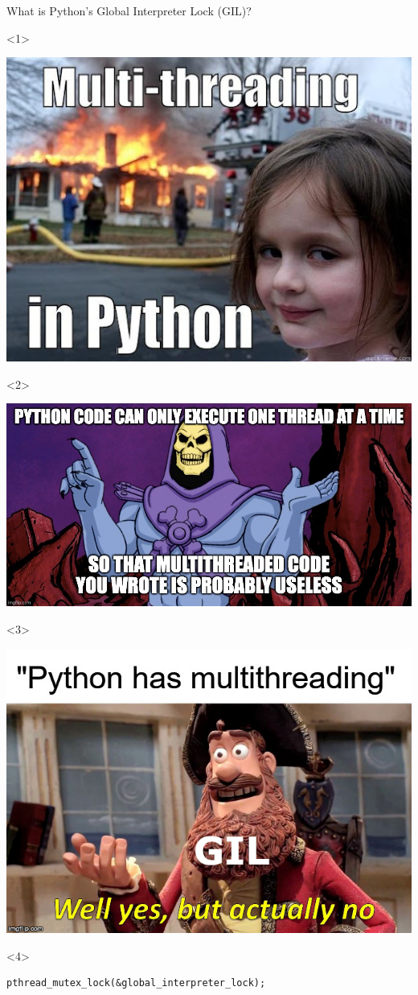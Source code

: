 \documentclass[aspectratio=169]{beamer}
\begin{document}
\begin{frame}[fragile]{What is Python's Global Interpreter Lock (GIL)?}
\Large
\vspace{1 cm}
\begin{onlyenv}<1>
\begin{center}
\includegraphics[height=5 cm]{img/python-gil-meme-1.jpg}
\end{center}
\end{onlyenv}\begin{onlyenv}<2>
\begin{center}
\includegraphics[height=5 cm]{img/python-gil-meme-2.jpg}
\end{center}
\end{onlyenv}\begin{onlyenv}<3>
\begin{center}
\includegraphics[height=5 cm]{img/python-gil-meme-3.png}
\end{center}
\end{onlyenv}\begin{onlyenv}<4>
\begin{verbatim}
pthread_mutex_lock(&global_interpreter_lock);


\end{verbatim}
\end{onlyenv}
\end{frame}
\end{document}
